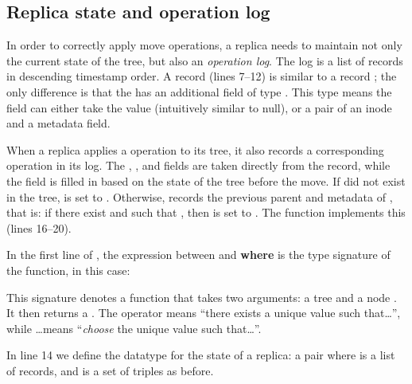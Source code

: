 \documentclass[sigplan,anonymous]{acmart}
\begin{document}
\subsection{Replica state and operation log}\label{sec:state-log}

In order to correctly apply move operations, a replica needs to maintain not only the current state of the tree, but also an \emph{operation log}.
The log is a list of  records in descending timestamp order.
A  record (lines 7--12) is similar to a record ; the only difference is that the  has an additional field  of type .
This  type means the field can either take the value  (intuitively similar to null), or a pair of an inode and a metadata field.

When a replica applies a  operation to its tree, it also records a corresponding  operation in its log.
The , ,  and  fields are taken directly from the  record, while the  field is filled in based on the state of the tree before the move.
If  did not exist in the tree,  is set to .
Otherwise,  records the previous parent and metadata of , that is: if there exist  and  such that , then  is set to .
The  function implements this (lines 16--20).

In the first line of , the expression between \isa{::} and \textbf{where} is the type signature of the function, in this case:
\begin{quote}
\end{quote}
This signature denotes a function that takes two arguments: a tree  and a node .
It then returns a .
The operator  means ``there exists a unique value  such that\dots'', while \dots means ``\emph{choose} the unique value  such that\ldots''.

In line 14 we define the datatype for the state of a replica: a pair  where  is a list of  records, and  is a set of  triples as before.
\end{document}
